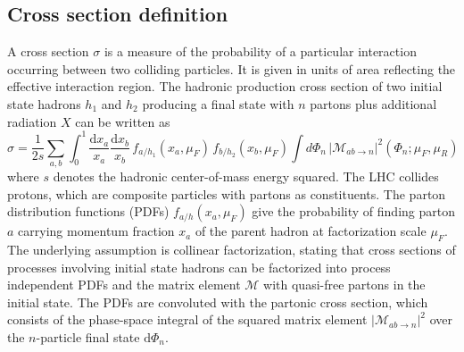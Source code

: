 \subsection{Cross section definition}
\label{sec:xsec_definition}
A cross section $\sigma$ is a measure of the probability of a particular interaction occurring between two colliding particles.
It is given in units of area reflecting the effective interaction region.
The hadronic production cross section of two initial state hadrons $h_1$ and $h_2$ producing a final state with $n$ partons plus additional radiation $X$ can be written as~\cite{black_book_qcd}
\begin{equation}
    \sigma = \frac{1}{2s}\sum_{a,b}\int_{0}^{1}\frac{\text{d}x_a}{x_a}\frac{\text{d}x_b}{x_b}\,f_{a/h_1}(x_a,\mu_F)\, f_{b/h_2}(x_b,\mu_F)\int d\Phi_n \,|\mathcal{M}_{ab\rightarrow n}|^2(\Phi_n;\mu_F,\mu_R)
    \label{eq:xsec:theo}
\end{equation}
where $s$ denotes the hadronic center-of-mass energy squared. 
The LHC collides protons, which are composite particles with partons as constituents.
The parton distribution functions (PDFs) $f_{a/h}(x_a, \mu_F)$ give the probability of finding parton $a$ carrying momentum fraction $x_a$ of the parent hadron at factorization scale $\mu_F$.
The underlying assumption is collinear factorization, stating that cross sections of processes involving initial state hadrons can be factorized 
into process independent PDFs and the matrix element $\mathcal{M}$ with quasi-free partons in the initial state.
The PDFs are convoluted with the partonic cross section, which consists of the phase-space integral of the squared matrix element $|\mathcal{M}_{ab \to n}|^2$ over the $n$-particle final state $\text{d}\Phi_n$.

